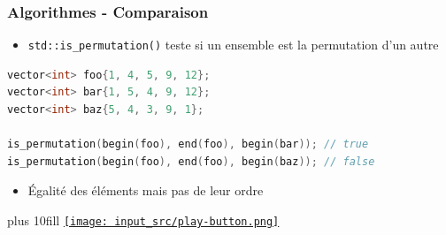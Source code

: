 \documentclass[C++.tex]{subfiles}
\begin{document}
\begin{frame}[fragile]
	\frametitle{Algorithmes - Comparaison}
	\begin{itemize}
		\item \lstinline|std::is_permutation()| teste si un ensemble est la permutation d'un autre
	\end{itemize}

	\begin{lstlisting}[language=C++]
vector<int> foo{1, 4, 5, 9, 12};
vector<int> bar{1, 5, 4, 9, 12};
vector<int> baz{5, 4, 3, 9, 1};

is_permutation(begin(foo), end(foo), begin(bar)); // true
is_permutation(begin(foo), end(foo), begin(baz)); // false\end{lstlisting}

	\begin{itemize}
		\item Égalité des éléments mais pas de leur ordre
	\end{itemize}

	\vskip 10mm plus 10fill
	\hfill
	\href{https://godbolt.org/#g:!((g:!((g:!((h:codeEditor,i:(filename:'1',fontScale:14,fontUsePx:'0',j:1,lang:c%2B%2B,selection:(endColumn:1,endLineNumber:24,positionColumn:1,positionLineNumber:24,selectionStartColumn:1,selectionStartLineNumber:24,startColumn:1,startLineNumber:24),source:'%23include+%3Ciostream%3E%0A%23include+%3Cvector%3E%0A%23include+%3Calgorithm%3E%0A%0Ausing+std::begin%3B%0Ausing+std::end%3B%0A%0Aint+main()%0A%7B%0A++%7B%0A++++std::vector%3Cint%3E+foo%7B1,+4,+5,+9,+12%7D%3B%0A++++std::vector%3Cint%3E+bar%7B5,+4,+12,+9,+1%7D%3B%0A%0A++++std::cout+%3C%3C+std::boolalpha+%3C%3C+std::is_permutation(begin(foo),+end(foo),+begin(bar))+%3C%3C+!'%5Cn!'%3B%0A++%7D%0A%0A++%7B%0A++++std::vector%3Cint%3E+foo%7B1,+4,+5,+9,+12%7D%3B%0A++++std::vector%3Cint%3E+bar%7B5,+4,+12,+7,+1%7D%3B%0A%0A++++std::cout+%3C%3C+std::boolalpha+%3C%3C+std::is_permutation(begin(foo),+end(foo),+begin(bar))+%3C%3C+!'%5Cn!'%3B%0A++%7D%0A%7D%0A'),l:'5',n:'0',o:'C%2B%2B+source+%231',t:'0')),k:50,l:'4',n:'0',o:'',s:0,t:'0'),(g:!((h:executor,i:(argsPanelShown:'1',compilationPanelShown:'0',compiler:g112,compilerOutShown:'0',execArgs:'',execStdin:'',fontScale:14,fontUsePx:'0',j:1,lang:c%2B%2B,libs:!((name:boost,ver:'175')),options:'-std%3Dc%2B%2B11',source:1,stdinPanelShown:'1',tree:'1',wrap:'0'),l:'5',n:'0',o:'Executor+x86-64+gcc+11.2+(C%2B%2B,+Editor+%231)',t:'0')),header:(),k:50,l:'4',n:'0',o:'',s:0,t:'0')),l:'2',n:'0',o:'',t:'0')),version:4}{\texttt{[image: input\_src/play-button.png]}}
\end{frame}
\end{document}
